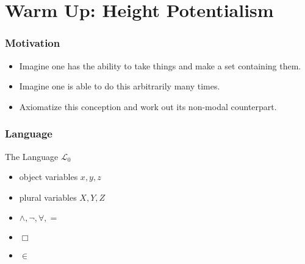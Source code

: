 \documentclass{beamer}
\begin{document}
\section{Warm Up: Height Potentialism}

\begin{frame}
    \frametitle{Motivation}
    \begin{itemize}
        \item<2->   Imagine one has the ability to take things and 
                    make a set containing them.
        \item<3->   Imagine one is able to do this arbitrarily many times.
        \item<4->   Axiomatize this conception and work out its non-modal counterpart.
    \end{itemize}
\end{frame}

\begin{frame}
    \frametitle{Language}
    \begin{block}{The Language $\mathcal{L}_0$}
        \begin{itemize}
            \item object variables $x, y, z$
            \item<2-> plural variables $X, Y, Z$
            \item<3-> $\wedge, \neg, \forall, =$
            \item<4-> $\Box$
            \item<5-> $\in$
        \end{itemize} 
    \end{block}
\end{frame}
\end{document}
